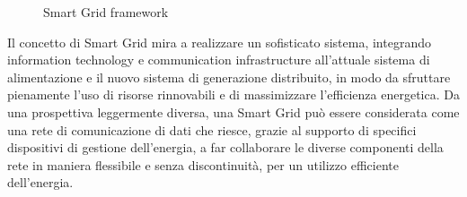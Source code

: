 \begin{figure}[h] 
\caption{Smart Grid framework}\label{fig:23}
\end{figure}

\newpage
Il concetto di Smart Grid mira a realizzare un sofisticato sistema, integrando information technology e communication infrastructure all'attuale sistema di alimentazione e il nuovo sistema di generazione distribuito, in modo da sfruttare pienamente l'uso di risorse rinnovabili e di massimizzare l'efficienza energetica. Da una prospettiva leggermente diversa, una Smart Grid può essere considerata come una rete di comunicazione di dati che riesce, grazie al supporto di specifici dispositivi di gestione dell'energia, a far collaborare le diverse componenti della rete in maniera flessibile e senza discontinuità, per un utilizzo efficiente dell'energia.

